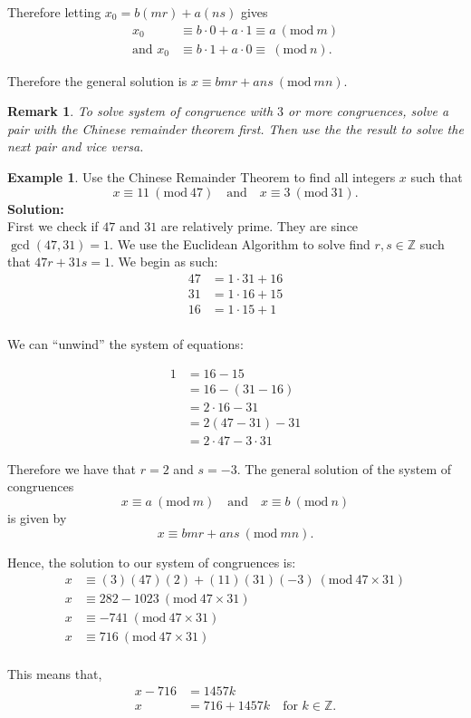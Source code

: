\documentclass[12pt, a4paper]{article}
\newcommand{\bb}[1]{\mathbb{#1}}
\newcommand{\Mod}[1]{\ (\mathrm{mod}\ #1)}
\newtheorem*{remark}{Remark}
\theoremstyle{definition}
\newtheorem*{example}{Example}
\theoremstyle{plain}
\begin{document}
Therefore letting $x_0 = b(mr)+a(ns)$ gives
$$\begin{aligned}
	x_0 &\equiv b\cdot 0+a\cdot 1 \equiv a \Mod{m} \\
\text{and }x_0 &\equiv b \cdot 1 + a\cdot  0 \equiv \Mod{n}.
\end{aligned}$$

Therefore the general solution is $x\equiv bmr+ans \Mod{mn}.$

\begin{remark}
To solve system of congruence with $3$ or more congruences, solve a pair with the Chinese remainder theorem first. Then use the the result to solve the next pair and vice versa.
\end{remark}

\begin{example}
Use the Chinese Remainder Theorem to find all integers $x$ such that 
$$x \equiv 11 \Mod{47} \quad \text{and} \quad x\equiv 3 \Mod{31}.$$
\textbf{Solution:} \\
First we check if $47$ and $31$ are relatively prime. They are since $\gcd(47,31)=1.$ We use the Euclidean Algorithm to solve find $r,s \in \bb{Z}$ such that $47r+31s=1.$ We begin as such:
$$\begin{aligned}
47&=1\cdot 31+16 \\
31&=1\cdot 16+15 \\
16&=1\cdot 15+1 \\
\end{aligned}$$ 

We can ``unwind'' the system of equations:

$$\begin{aligned}
1 	&= 16-15 \\
	&= 16-(31-16)\\
	&= 2 \cdot 16 -31 \\
	&= 2(47-31)-31\\
	&= 2 \cdot 47 - 3\cdot 31
\end{aligned}$$

Therefore we have that $r=2$ and $s=-3.$ The general solution of the system of congruences 
$$x \equiv a \Mod{m} \quad \text{and} \quad x \equiv b \Mod{n}$$ 
is given by 
$$x \equiv bmr+ans \Mod{mn}.$$

Hence, the solution to our system of congruences is: 
$$\begin{aligned}
x &\equiv (3)(47)(2)+(11)(31)(-3) \Mod{47 \times 31} \\
x &\equiv 282-1023 \Mod{47 \times 31} \\
x &\equiv -741 \Mod{47 \times 31} \\
x &\equiv 716 \Mod{47 \times 31} \\
\end{aligned}$$

This means that, 
$$\begin{aligned}
x-716&=1457k \\
x&=716 +1457k \quad \text{for } k\in \bb{Z}.
\end{aligned}$$
\end{example}
\end{document}
